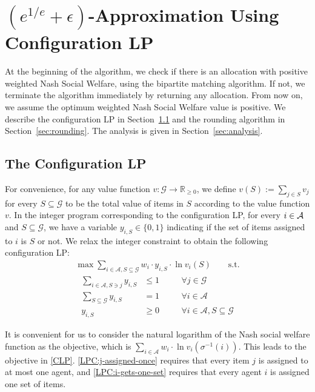 \documentclass{theoretics}
\newcommand\calA{{\mathcal{A}}}
\newcommand\calG{{\mathcal{G}}}
\newcommand{\R}{{\mathbb{R}}}
\begin{document}
\section{\texorpdfstring{$(e^{1/e} + \epsilon)$}{e to the 1/e + epsilon}-Approximation Using Configuration LP}
At the beginning of the algorithm, we check if there is an allocation with positive weighted Nash Social Welfare, using the bipartite matching algorithm. If not, we terminate the algorithm immediately by returning any allocation. From now on, we assume the optimum weighted Nash Social Welfare value is positive.  We describe the configuration LP in Section~\ref{sec:LP} and the rounding algorithm in Section~\ref{sec:rounding}. The analysis is given in Section~\ref{sec:analysis}.

\subsection{The Configuration LP} \label{sec:LP}

For convenience, for any value function $v: \calG \to \R_{\geq 0}$, we define $v(S):= \sum_{j \in S}v_j$ for every $S \subseteq \calG$ to be the total value of items in $S$ according to the value function $v$. In the integer program corresponding to the configuration LP, for every $i \in \cal A$ and $S \subseteq \calG$, we have a variable $y_{i, S} \in \{0, 1\}$ indicating if the set of items assigned to $i$ is $S$ or not. We relax the integer constraint to obtain the following configuration LP: 
\begin{align}
    \max \sum_{i \in \calA, S \subseteq  \calG} w_i \cdot y_{i, S} \cdot \ln v_i(S) \qquad \text{s.t.} \tag{Conf-LP}\label{CLP}
\end{align} \vspace*{-10pt}
\begin{align}
    \sum_{i \in \calA, S \ni j} y_{i, S} &\leq 1 &\quad &\forall j \in \calG \label{LPC:j-assigned-once}\\
    \sum_{S \subseteq \calG} y_{i, S} &= 1 &\quad &\forall i \in \calA \label{LPC:i-gets-one-set}\\
    y_{i, S} &\geq 0 &\quad &\forall i \in \calA, S\subseteq \calG
\end{align}

It is convenient for us to consider the natural logarithm of the Nash social welfare function as the objective, which is $\sum_{i \in \calA} w_i \cdot \ln v_i (\sigma^{-1}(i))$. This leads to the objective in \eqref{CLP}.  \eqref{LPC:j-assigned-once} requires that every item $j$ is assigned to at most one agent, and \eqref{LPC:i-gets-one-set} requires that every agent $i$ is assigned one set of items. 
\end{document}

